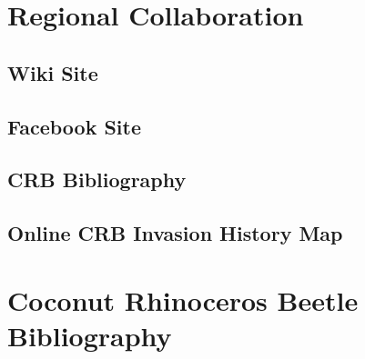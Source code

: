 \documentclass[12pt,letterpaper,english,bibliography=totocnumbered]{scrartcl}
\begin{document}
\newpage
\section{Regional Collaboration}

\subsection{Wiki Site}

\subsection{Facebook Site}

\subsection{CRB Bibliography}
\cite{moore_coconut_2019}

\subsection{Online CRB Invasion History Map}


\newpage
\printbibliography

\appendix
\addappheadtotoc


\newpage
\section{Coconut Rhinoceros Beetle Bibliography}
\end{document}
